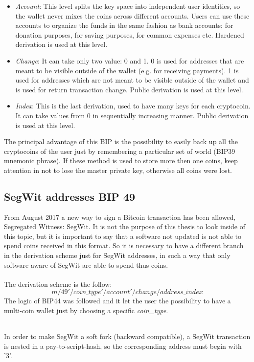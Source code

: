 \begin{itemize}
	\item \textit{Account}: This level splits the key space into independent user identities, so the wallet never mixes the coins across different accounts.
	Users can use these accounts to organize the funds in the same fashion as bank accounts; for donation purposes, for saving purposes, for common expenses etc.
	Hardened derivation is used at this level.
	\item \textit{Change}: It can take only two value: 0 and 1. 0 is used for addresses that are meant to be visible outside of the wallet (e.g. for receiving payments). 1 is used for addresses which are not meant to be visible outside of the wallet and is used for return transaction change.
	Public derivation is used at this level.
	\item \textit{Index}: This is the last derivation, used to have many keys for each cryptocoin. It can take values from 0 in sequentially increasing manner. Public derivation is used at this level.
\end{itemize}
The principal advantage of this BIP is the possibility to easily back up all the cryptocoins of the user just by remembering a particular set of world (BIP39 mnemonic phrase). If these method is used to store more then one coins, keep attention in not to lose the master private key, otherwise all coins were lost.

\subsection{SegWit addresses BIP 49}
From August 2017 a new way to sign a Bitcoin transaction has been allowed, Segregated Witness: SegWit. It is not the purpose of this thesis to look inside of this topic, but it is important to say that a software not updated is not able to spend coins received in this format. So it is necessary to have a different branch in the derivation scheme just for SegWit addresses, in such a way that only software aware of SegWit are able to spend thus coins.
\\ \\
The derivation scheme is the follow:
\begin{equation*}
m / 49' / coin\_type' / account' / change / address\_index
\end{equation*}
The logic of BIP44 was followed and it let the user the possibility to have a multi-coin wallet just by choosing a specific \textit{coin\_type}.
\\ \\
\begin{remark}
	In order to make SegWit a soft fork (backward compatible), a SegWit transaction is nested in a pay-to-script-hash, so the corresponding address must begin with '3'.	
\end{remark}




